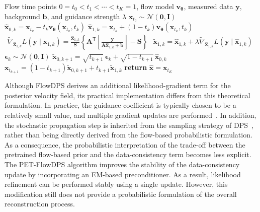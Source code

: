 \documentclass[journal]{IEEEtran}
\begin{document}
\begin{algorithm}[t]
  \caption{PET-FlowDPS reconstruction}
  \label{alg:petflowdps}
  \begin{algorithmic}[1]
    \REQUIRE Flow time points $0=t_0<t_1<\cdots<t_K=1$, flow model $\bm{v}_{\bm{\theta}}$, measured data $\bm{y}$, background $\bm{b}$, and guidance strength $\lambda$
    \STATE $\bm{x}_{t_0}\sim\mathcal{N}(\bm{0},\bm{I})$
        \STATE $\hat{\bm{x}}_{0,k} = \bm{x}_{t_k} - t_k\bm{v}_{\bm{\theta}}(\bm{x}_{t_k},t_k)$
        \STATE $\hat{\bm{x}}_{1,k} = \bm{x}_{t_k} + (1-t_k)\bm{v}_{\bm{\theta}}(\bm{x}_{t_k},t_k)$
        \STATE $\begin{aligned} \tilde{\nabla}_{\hat{\bm{x}}_{1,k}} L(\bm{y}\mid\hat{\bm{x}}_{1,k}) =
        \frac{\hat{\bm{x}}_{1,k}}{\bm{S}} \left\{ \bm{A}^{\mathsf{T}} \left[ \frac{\bm{y}} {\bm{A}\hat{\bm{x}}_{1,k}+\bm{b}} \right] - \bm{S} \right\}
        \end{aligned}$
        \STATE $\tilde{\bm{x}}_{1,k} = \hat{\bm{x}}_{1,k} + \lambda \tilde{\nabla}_{\hat{\bm{x}}_{1,k}} L(\bm{y}\mid\hat{\bm{x}}_{1,k})$
        \STATE $\bm{\epsilon}_k \sim\mathcal{N}(\bm{0},\bm{I})$
        \STATE $\tilde{\bm{x}}_{0,k+1} = \sqrt{t_{k+1}}\,\bm{\epsilon}_k + \sqrt{1-t_{k+1}}\,\hat{\bm{x}}_{0,k}$
        \STATE $\bm{x}_{t_{k+1}} = (1-t_{k+1})\tilde{\bm{x}}_{0,k+1} + t_{k+1}\tilde{\bm{x}}_{1,k}$
    \ENDFOR
    \STATE \textbf{return} $\hat{\bm{x}}=\bm{x}_{t_K}$
  \end{algorithmic}
\end{algorithm}
Although FlowDPS derives an additional likelihood-gradient term for the posterior velocity field, its practical implementation differs from this theoretical formulation. In practice, the guidance coefficient is typically chosen to be a relatively small value, and multiple gradient updates are performed~\cite{Kim_2025_ICCV}. In addition, the stochastic propagation step is inherited from the sampling strategy of DPS~\cite{chung2023diffusion}, rather than being directly derived from the flow-based probabilistic formulation. As a consequence, the probabilistic interpretation of the trade-off between the pretrained flow-based prior and the data-consistency term becomes less explicit. The PET-FlowDPS algorithm improves the stability of the data-consistency update by incorporating an EM-based preconditioner. As a result, likelihood refinement can be performed stably using a single update. However, this modification still does not provide a probabilistic formulation of the overall reconstruction process.
\end{document}
